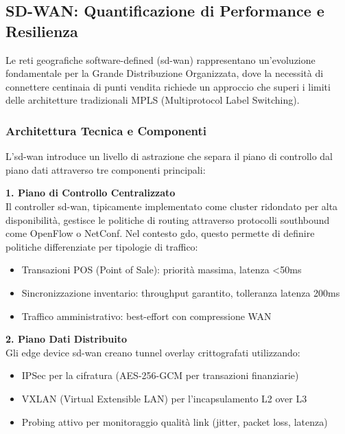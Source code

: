 \subsection{\texorpdfstring{SD-WAN: Quantificazione di Performance e Resilienza}{3.3.1 - SD-WAN: Quantificazione di Performance e Resilienza}}

Le reti geografiche software-defined (\gls{sd-wan}) rappresentano un'evoluzione fondamentale per la Grande Distribuzione Organizzata, dove la necessità di connettere centinaia di punti vendita richiede un approccio che superi i limiti delle architetture tradizionali MPLS (Multiprotocol Label Switching).

\subsubsection{\texorpdfstring{Architettura Tecnica e Componenti}{3.3.1.1 - Architettura Tecnica e Componenti}}

L'\gls{sd-wan} introduce un livello di astrazione che separa il piano di controllo dal piano dati attraverso tre componenti principali:

\textbf{1. Piano di Controllo Centralizzato}\\
Il controller \gls{sd-wan}, tipicamente implementato come cluster ridondato per alta disponibilità, gestisce le politiche di routing attraverso protocolli southbound come OpenFlow o NetConf. Nel contesto \gls{gdo}, questo permette di definire politiche differenziate per tipologie di traffico:
\begin{itemize}
    \item Transazioni POS (Point of Sale): priorità massima, latenza <50ms
    \item Sincronizzazione inventario: throughput garantito, tolleranza latenza 200ms
    \item Traffico amministrativo: best-effort con compressione WAN
\end{itemize}

\textbf{2. Piano Dati Distribuito}\\
Gli edge device \gls{sd-wan} creano tunnel overlay crittografati utilizzando:
\begin{itemize}
    \item IPSec per la cifratura (AES-256-GCM per transazioni finanziarie)
    \item VXLAN (Virtual Extensible LAN) per l'incapsulamento L2 over L3
    \item Probing attivo per monitoraggio qualità link (jitter, packet loss, latenza)
\end{itemize}

